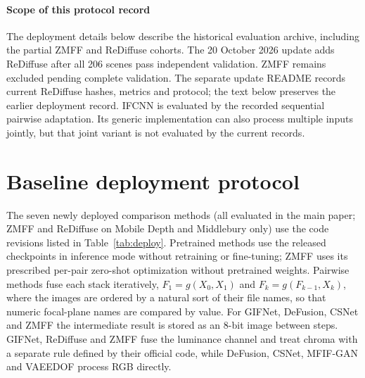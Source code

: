 \paragraph{Scope of this protocol record}
The deployment details below describe the historical evaluation archive, including the partial ZMFF and ReDiffuse cohorts. The 20 October 2026 update adds ReDiffuse after all 206 scenes pass independent validation. ZMFF remains excluded pending complete validation. The separate update README records current ReDiffuse hashes, metrics and protocol; the text below preserves the earlier deployment record. IFCNN is evaluated by the recorded sequential pairwise adaptation. Its generic implementation can also process multiple inputs jointly, but that joint variant is not evaluated by the current records.

\section{Baseline deployment protocol}
\label{supp:baselines}

The seven newly deployed comparison methods (all evaluated in the main paper; ZMFF and ReDiffuse on Mobile Depth and Middlebury only) use the code revisions listed in Table~\ref{tab:deploy}. Pretrained methods use the released checkpoints in inference mode without retraining or fine-tuning; ZMFF uses its prescribed per-pair zero-shot optimization without pretrained weights. Pairwise methods fuse each stack iteratively, $F_1=g(X_0,X_1)$ and $F_k=g(F_{k-1},X_k)$, where the images are ordered by a natural sort of their file names, so that numeric focal-plane names are compared by value. For GIFNet, DeFusion, CSNet and ZMFF the intermediate result is stored as an 8-bit image between steps. GIFNet, ReDiffuse and ZMFF fuse the luminance channel and treat chroma with a separate rule defined by their official code, while DeFusion, CSNet, MFIF-GAN and VAEEDOF process RGB directly.

